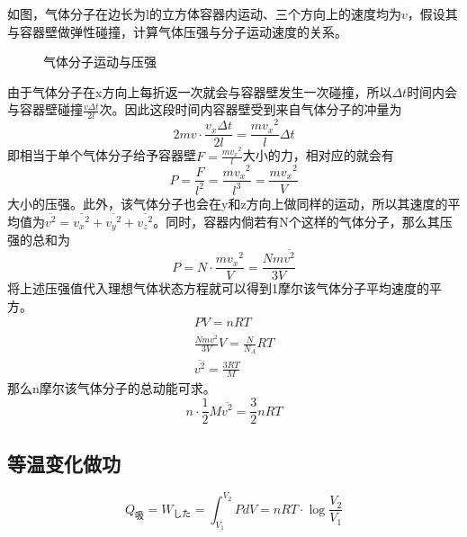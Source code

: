 如图，气体分子在边长为l的立方体容器内运动、三个方向上的速度均为$v$，假设其与容器壁做弹性碰撞，计算气体压强与分子运动速度的关系。
\begin{figure}[ht!]
    \centering
    \caption{气体分子运动与压强}
\end{figure}
由于气体分子在x方向上每折返一次就会与容器壁发生一次碰撞，所以$\Delta t$时间内会与容器壁碰撞$\frac{v\Delta t}{2l}$次。因此这段时间内容器壁受到来自气体分子的冲量为
\begin{equation*}
    2mv\cdot\frac{v_x\Delta t}{2l}=\frac{m{v_x}^2}{l}\Delta t
\end{equation*}
即相当于单个气体分子给予容器壁$F=\frac{m{v_x}^2}{l}$大小的力，相对应的就会有
\begin{equation*}
    P=\frac{F}{l^2}=\frac{m{v_x}^2}{l^3}=\frac{m{v_x}^2}{V}
\end{equation*}
大小的压强。此外，该气体分子也会在y和z方向上做同样的运动，所以其速度的平均值为$\overline{v^2}=\overline{{v_x}^2}+\overline{{v_y}^2}+\overline{{v_z}^2}$。同时，容器内倘若有N个这样的气体分子，那么其压强的总和为
\begin{equation*}
    P=N\cdot\frac{m{v_x}^2}{V}=\frac{Nm\overline{v^2}}{3V}
\end{equation*}
将上述压强值代入理想气体状态方程就可以得到1摩尔该气体分子平均速度的平方。
\begin{gather*}
    PV=nRT\\
    \frac{Nm\overline{v^2}}{3V}V=\frac{N}{N_A}RT\\
    \overline{v^2}=\frac{3RT}{M}
\end{gather*}
那么n摩尔该气体分子的总动能可求。
\begin{equation*}
    n\cdot\frac12M\overline{v^2}=\frac32nRT
\end{equation*}

\subsection{等温变化做功}

\begin{equation*}
    Q_\textrm{吸}=W_\textrm{した}=\int_{V_1}^{V_2}PdV=nRT\cdot\log\frac{V_2}{V_1}
\end{equation*}

